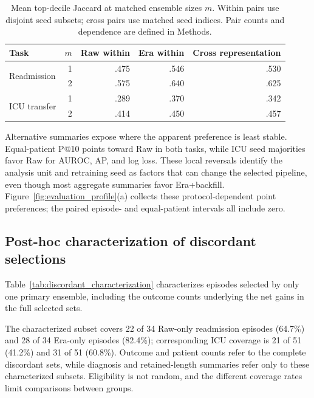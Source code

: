\documentclass{article}
\begin{document}
\begin{table}[!htbp]
  \caption{Mean top-decile Jaccard at matched ensemble sizes $m$.
  Within pairs use disjoint seed subsets; cross pairs use matched seed indices.
  Pair counts and dependence are defined in Methods.}
  \label{tab:matched_size_stability}
  \centering
  \small
  \begin{tabular*}{\linewidth}{@{\extracolsep{\fill}}lrrrr@{}}
    \toprule
    Task & $m$ & Raw within & Era within & Cross representation \\
    \midrule
    \multirow{2}{*}{Readmission}
      & 1 & .475 & .546 & .530 \\
      & 2 & .575 & .640 & .625 \\
    \midrule
    \multirow{2}{*}{ICU transfer}
      & 1 & .289 & .370 & .342 \\
      & 2 & .414 & .450 & .457 \\
    \bottomrule
  \end{tabular*}
\end{table}

Alternative summaries expose where the apparent preference is least stable.
Equal-patient P@10 points toward Raw in both tasks, while ICU seed majorities
favor Raw for AUROC, AP, and log loss. These local reversals identify the
analysis unit and retraining seed as factors that can change the selected
pipeline, even though most aggregate summaries favor Era+backfill.
Figure~\ref{fig:evaluation_profile}(a) collects these protocol-dependent point
preferences; the paired episode- and equal-patient intervals all include zero.

\subsection{Post-hoc characterization of discordant selections}

Table~\ref{tab:discordant_characterization} characterizes episodes selected by
only one primary ensemble, including the outcome counts underlying the net
gains in the full selected sets.

The characterized subset covers 22 of 34 Raw-only readmission episodes
(64.7\%) and 28 of 34 Era-only episodes (82.4\%); corresponding ICU coverage
is 21 of 51 (41.2\%) and 31 of 51 (60.8\%). Outcome and patient counts refer
to the complete discordant sets, while diagnosis and retained-length summaries
refer only to these characterized subsets. Eligibility is not random, and the
different coverage rates limit comparisons between groups.
\end{document}
